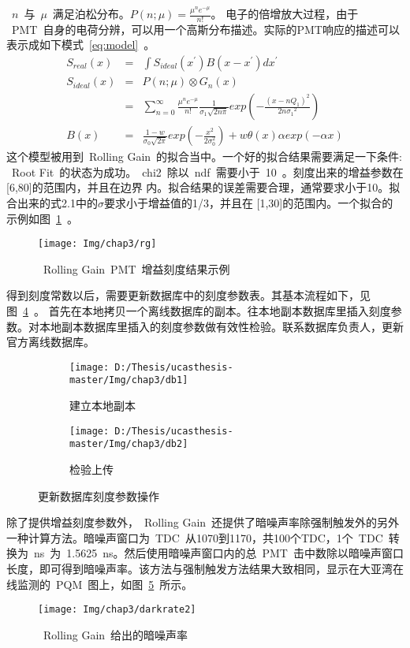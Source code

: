  ~$n$~与~$\mu$~满足泊松分布。$P(n;\mu)=\frac{\mu^{n}e^{-\mu}}{n!}$。 电子的倍增放大过程，由于
 ~PMT~自身的电荷分辨，可以用一个高斯分布描述。实际的PMT响应的描述可以表示成如下模式~\ref{eq:model}~。
 \begin{eqnarray} \label{eq:model}
 S_{real}(x) &=& \int S_{ideal}(x^{\prime})B(x-x^{\prime})dx^{\prime}\\
 S_{ideal}(x) &=& P(n;\mu)\otimes G_n(x) \nonumber \\
 &=& \sum_{n=0}^{\infty} \frac{{\mu}^n e^{-\mu}}{n!}\frac{1}{\sigma_1\sqrt{2n\pi}}exp(-\frac{{(x-nQ_1)}^2}{2n{\sigma_1}^2}) \\
B(x)&=&\frac{1-w}{\sigma_0\sqrt{2\pi}}exp(-\frac{x^2}{2\sigma_0^2})+w\theta (x) \alpha exp(-\alpha x ) \end{eqnarray}
这个模型被用到~Rolling Gain~的拟合当中。一个好的拟合结果需要满足一下条件:
~Root Fit~的状态为成功。~chi2~除以~ndf~需要小于~10~。刻度出来的增益参数在[6,80]的范围内，并且在边界
内。拟合结果的误差需要合理，通常要求小于10。拟合出来的式2.1中的$\sigma$要求小于增益值的1/3，并且在
[1,30]的范围内。一个拟合的示例如图~\ref{fig:rg}~。
\begin{figure}[!htb]
  \centering
   \texttt{[image: Img/chap3/rg]}
    \caption{~Rolling Gain~PMT~增益刻度结果示例}
  \label{fig:rg}
\end{figure}
得到刻度常数以后，需要更新数据库中的刻度参数表。其基本流程如下，见图~\ref{fig:db}~。
首先在本地拷贝一个离线数据库的副本。往本地副本数据库里插入刻度参数。对本地副本数据库里插入的刻度参数做有效性检验。联系数据库负责人，更新官方离线数据库。
\begin{figure}[!htb]
  \centering
  \begin{subfigure}[b]{\MySubFactor\textwidth}
    \texttt{[image: D:/Thesis/ucasthesis-master/Img/chap3/db1]}
    \caption{建立本地副本}
    \label{fig:db_1}
  \end{subfigure}%
  \begin{subfigure}[b]{\MySubFactor\textwidth}
    \texttt{[image: D:/Thesis/ucasthesis-master/Img/chap3/db2]}
    \caption{检验上传}
    \label{fig:db_2}
  \end{subfigure}
  \caption{更新数据库刻度参数操作}
  \label{fig:db}
\end{figure}
除了提供增益刻度参数外，~Rolling Gain~还提供了暗噪声率除强制触发外的另外一种计算方法。暗噪声窗口为~TDC~从1070到1170，共100个TDC，1个~TDC~转换为~ns~为~1.5625~ns。然后使用暗噪声窗口内的总~PMT~击中数除以暗噪声窗口长度，即可得到暗噪声率。该方法与强制触发方法结果大致相同，显示在大亚湾在线监测的~PQM~图上，如图~\ref{fig:darkrate}~所示。
\begin{figure}[!htb]
  \centering
   \texttt{[image: Img/chap3/darkrate2]}
    \caption{~Rolling Gain~给出的暗噪声率}
  \label{fig:darkrate}
\end{figure}
